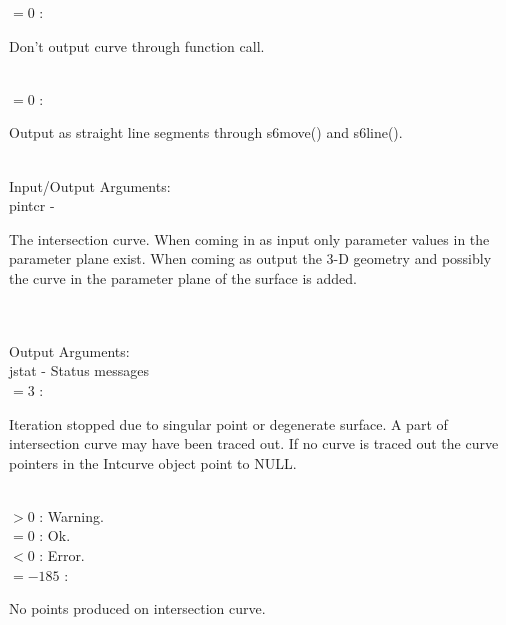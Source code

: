                     \>\>\>\>\> $= 0$ \> : \begin{minipg5}
                                            Don't output curve through
                                            function call.
                                          \end{minipg5}\\[0.3ex]
                    \>\>\>\>\> $= 0$ \> : \begin{minipg5}
                                             Output as straight line
                                             segments through s6move()
                                             and s6line().
                                          \end{minipg5}\\[0.8ex]
\newpagetabs
        \>Input/Output Arguments:\\
        \>\>    {\fov pintcr}\> - \>
        \begin{minipg2}
          The intersection curve. When coming in as input
          only parameter values in the parameter plane
          exist. When coming as output the 3-D geometry
          and possibly the curve in the parameter plane
          of the surface is added.
        \end{minipg2}\\[0.8ex]
\\
        \>Output Arguments:\\
        \>\>    {\fov jstat}     \> - \> Status messages\\
        \>\>\>\> $= 3$ \>\> :
                \begin{minipg5}
                  Iteration stopped due to singular
                  point or degenerate surface. A part
                  of intersection curve may have been
                  traced out. If no curve is traced out
                  the curve pointers in the Intcurve
                  object point to NULL.
                \end{minipg5}\\[0.8ex]
        \>\>\>\> $> 0$ \>\> : Warning.\\
        \>\>\>\> $= 0$ \>\> : Ok.\\
        \>\>\>\> $< 0$ \>\> : Error.\\
        \>\>\>\> $= -185$ \>\> :
        \begin{minipg5}
          No points produced on intersection curve.
        \end{minipg5}\\[0.8ex]
